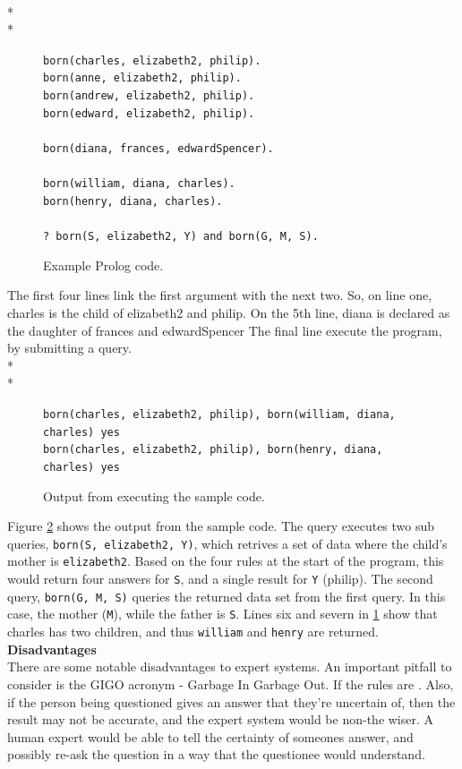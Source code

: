 \documentclass[12pt]{report}
\begin{document}
\\*
\\*
\begin{figure}[H]
\texttt{born(charles, elizabeth2, philip).\\
born(anne,    elizabeth2, philip).\\
born(andrew,  elizabeth2, philip).\\
born(edward,  elizabeth2, philip).\\
\\
born(diana,   frances,    edwardSpencer).\\
\\
born(william, diana,      charles).\\
born(henry,   diana,      charles).\\
\\
? born(S, elizabeth2, Y) and born(G, M, S).}
\caption{Example Prolog code.\citep{thehouseofwindsor}}
\label{fig:prolog_code}
\end{figure}
The first four lines link the first argument with the next two.  So, on line one, charles is the child of elizabeth2 and philip.  On the 5th line, diana is declared as the daughter of frances and edwardSpencer 
The final line execute the program, by submitting a query.
\\*
\\*
\begin{figure}[H]
\texttt{born(charles, elizabeth2, philip), born(william, diana, charles) yes\\
born(charles, elizabeth2, philip), born(henry, diana, charles) yes}
\caption{Output from executing the sample code.}
\label{fig:prolog_output}
\end{figure}
Figure \ref{fig:prolog_output} shows the output from the sample code.  The query executes two sub queries, \texttt{born(S, elizabeth2, Y)}, which retrives a set of data where the child's mother is \texttt{elizabeth2}.  Based on the four rules at the start of the program, this would return four answers for \texttt{S}, and a single result for \texttt{Y} (philip).  The second query, \texttt{born(G, M, S)} queries the returned data set from the first query.  In this case, the mother (\texttt{M}), while the father is \texttt{S}.  Lines six and severn in \ref{fig:prolog_code} show that charles has two children, and thus \texttt{william} and \texttt{henry} are returned.
\clearpage
\textbf{Disadvantages}\\
There are some notable disadvantages to expert systems.  An important pitfall to consider is the GIGO acronym - Garbage In Garbage Out.  If the rules are .  Also, if the person being questioned gives an answer that they're uncertain of, then the result may not be accurate, and the expert system would be non-the wiser.  A human expert would be able to tell the certainty of someones answer, and possibly re-ask the question in a way that the questionee would understand.
\end{document}
